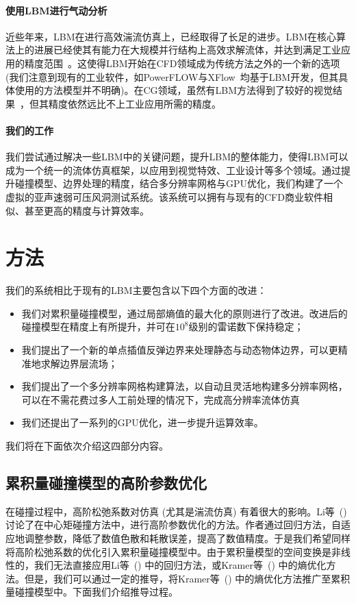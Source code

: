 \paragraph{使用LBM进行气动分析}
近些年来，LBM在进行高效湍流仿真上，已经取得了长足的进步。LBM在核心算法上的进展已经使其有能力在大规模并行结构上高效求解流体，并达到满足工业应用的精度范围~\cite{Li-2020,Lallemand:2021}。这使得LBM开始在CFD领域成为传统方法之外的一个新的选项 (我们注意到现有的工业软件，如PowerFLOW与XFlow~\cite{Simulia}均基于LBM开发，但其具体使用的方法模型并不明确)。在CG领域，虽然有LBM方法得到了较好的视觉结果~\cite{Li-2020,Lyu:2021}，但其精度依然远比不上工业应用所需的精度。

\paragraph{我们的工作}
我们尝试通过解决一些LBM中的关键问题，提升LBM的整体能力，使得LBM可以成为一个统一的流体仿真框架，以应用到视觉特效、工业设计等多个领域。通过提升碰撞模型、边界处理的精度，结合多分辨率网格与GPU优化，我们构建了一个虚拟的亚声速弱可压风洞测试系统。该系统可以拥有与现有的CFD商业软件相似、甚至更高的精度与计算效率。

\section{方法}
我们的系统相比于现有的LBM主要包含以下四个方面的改进：
\begin{itemize}
	\item 我们对累积量碰撞模型，通过局部熵值的最大化的原则进行了改进。改进后的碰撞模型在精度上有所提升，并可在$10^8$级别的雷诺数下保持稳定； 
	\item 我们提出了一个新的单点插值反弹边界来处理静态与动态物体边界，可以更精准地求解边界层流场；
	\item 我们提出了一个多分辨率网格构建算法，以自动且灵活地构建多分辨率网格，可以在不需花费过多人工前处理的情况下，完成高分辨率流体仿真
	\item 我们还提出了一系列的GPU优化，进一步提升运算效率。
\end{itemize}

我们将在下面依次介绍这四部分内容。

\subsection{累积量碰撞模型的高阶参数优化}
在碰撞过程中，高阶松弛系数对仿真 (尤其是湍流仿真) 有着很大的影响。Li等~(\citeyear{Li-2020}) 讨论了在中心矩碰撞方法中，进行高阶参数优化的方法。作者通过回归方法，自适应地调整参数，降低了数值色散和耗散误差，提高了数值精度。于是我们希望同样将高阶松弛系数的优化引入累积量碰撞模型中。由于累积量模型的空间变换是非线性的，我们无法直接应用Li等~(\citeyear{Li-2020}) 中的回归方法，或Kramer等~(\citeyear{Kramer-2019}) 中的熵优化方法。但是，我们可以通过一定的推导，将Kramer等~(\citeyear{Kramer-2019}) 中的熵优化方法推广至累积量碰撞模型中。下面我们介绍推导过程。

